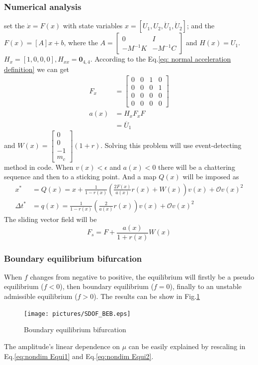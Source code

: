 \documentclass{article}
\begin{document}
\subsubsection{Numerical analysis}
set the $\dot x=F(x)$ with state variables $x=[U_1,U_2,\dot U_1,\dot U_2]$; and the $F(x)=[A]x+b$, where the $A=\begin{bmatrix} 0 & I\\ -M^{-1}K& -M^{-1}C \end{bmatrix}$ and $H(x)=U_1$. $H_x=[1,0,0,0],H_{xx}=\mathbf{0}_{4,4}$. According to the Eq.\ref{eq: normal acceleration definition} we can get \begin{align}
    \nonumber
    F_x&=\begin{bmatrix}
    0 & 0 & 1 & 0\\
    0 & 0 & 0 & 1\\
    0 & 0 & 0 & 0\\
    0 & 0 & 0 & 0
    \end{bmatrix} \\ 
    a(x)&= H_x F_x F\\ \nonumber
    &=\ddot{U_1}
\end{align}and $W(x)=\begin{bmatrix}
0\\ 0\\-1\\m_c 
\end{bmatrix}(1+r)$. Solving this problem will use event-detecting method in code. When $v(x)<\epsilon$ and $a(x)<0$ there will be a chattering sequence and then to a sticking point. And a map $Q(x)$ will be imposed as
\begin{align}
    x^*&=Q(x)=x+\frac{1}{1-r(x)}\left(\frac{2F(x)}{a(x)} r(x) +W(x)\right)v(x)+\mathcal{O}v(x)^2\\
    \Delta t^*&=q(x)=\frac{1}{1-r(x)}\left(\frac{2}{a(x)} r(x) \right)v(x)+\mathcal{O}v(x)^2
\end{align}
The sliding vector field will be \[F_s= F+\frac{a(x)}{1+r(x)}W(x)\]
\subsubsection{Boundary equilibrium bifurcation}
When $f$ changes from negative to positive, the equilibrium will firstly be a pseudo equilibrium ($f<0$), then boundary equilibrium ($f=0$), finally to an unstable admissible equilibrium ($f>0$). The results can be show in Fig.\ref{fig:SDOF BEB} 
\begin{figure}[htpb]
    \centering
    \texttt{[image: pictures/SDOF\_BEB.eps]}
    \caption{Boundary equilibrium bifurcation}
    \label{fig:SDOF BEB}
\end{figure}
The amplitude's linear dependence on $\mu$ can be easily  explained by rescaling in Eq.\ref{eq:nondim Equi1} and Eq.\ref{eq:nondim Equi2}. 
\end{document}
